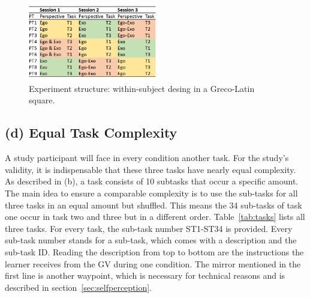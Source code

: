 \begin{figure}[htb]
	\centering
	\includegraphics[width=0.5\textwidth]{figures/study_session_plan.png}
	\caption[Study structure]{Experiment structure: within-subject desing in a Greco-Latin square.}
	\label{fig:study_session_plan}
\end{figure}

\subsection{(d) Equal Task Complexity}
A study participant will face in every condition another task. For the study's validity, it is indispensable that these three tasks have nearly equal complexity. As described in (b), a task consists of 10 subtasks that occur a specific amount. The main idea to ensure a comparable complexity is to use the sub-tasks for all three tasks in an equal amount but shuffled. This means the 34 sub-tasks of task one occur in task two and three but in a different order. Table~\ref{tab:tasks} lists all three tasks. For every task, the sub-task number ST1-ST34 is provided. Every sub-task number stands for a sub-task, which comes with a description and the sub-task ID. Reading the description from top to bottom are the instructions the learner receives from the GV during one condition. The mirror mentioned in the first line is another waypoint, which is necessary for technical reasons and is described in section~\ref{sec:selfperception}.

